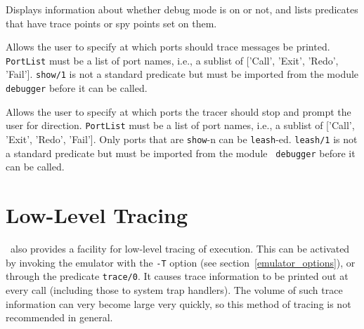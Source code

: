 \begin{description}
 
    Displays information about whether debug mode is on or not, and lists
    predicates that have trace points or spy points set on them.

 
    Allows the user to specify at which ports should trace messages be
    printed. {\tt PortList} must be a list of port names, i.e., a sublist
    of ['Call', 'Exit', 'Redo', 'Fail']. {\tt show/1} is not a standard
    predicate but must be imported from the module {\tt debugger} before
    it can be called.

 
    Allows the user to specify at which ports the tracer should stop
    and prompt the user for direction.  {\tt PortList} must be a list of
    port names, i.e., a sublist of ['Call', 'Exit', 'Redo', 'Fail'].  Only
    ports that are {\tt show}-n can be {\tt leash}-ed.  {\tt leash/1} is
    not a standard predicate but must be imported from the module {\tt
    debugger} before it can be called.
\end{description}


\section{Low-Level Tracing}
 

\ourprolog\ also provides a facility for low-level tracing of execution.
This can be activated by invoking the emulator with the {\tt -T} option
(see section~\ref{emulator_options}), or through the predicate {\tt trace/0}.
It causes trace information to be printed out at every call (including
those to system trap handlers).  The volume of such trace information
can very become large very quickly, so this method of tracing is not
recommended in general.

